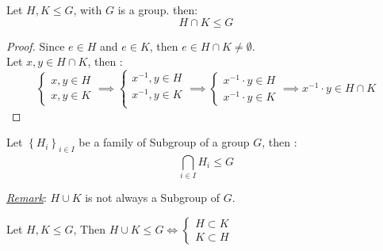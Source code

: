 \begin{proposition}
  Let $H, K \leq G $, with $G $ is a group. then: 
  \[
  H \cap K \leq G
  \]
\end{proposition}
  \begin{proof}
    Since $e \in H $ and $e \in  K$, then $e \in  H \cap K \neq  \emptyset $. \\
    Let $x,y \in  H \cap K $, then : 
    \[
    \begin{cases}
    x,y \in  H \\
    x,y \in  K
    \end{cases} \implies 
    \begin{cases}
    x^{-1}, y \in  H \\
    x^{-1}, y \in  K \\
    \end{cases}
    \implies  
    \begin{cases}
    x^{-1} \cdot y \in H \\
    x^{-1} \cdot y \in K
    \end{cases}
    \implies x^{-1} \cdot y \in H \cap K
    \]
  \end{proof}
 \begin{proposition}
   Let $\left\{ H_{i} \right\}_{i \in  I} $ be a family of Subgroup of a group $G $, then : 
   \[
     \bigcap_{i \in  I}^{} H_{i} \leq G
   \]
 \end{proposition}
\underline{\emph{Remark}}: $H \cup K $ is not always a Subgroup of $G $.
 \begin{proposition}
   Let $H, K \leq G$, Then $H \cup K \leq G \iff  \begin{cases}
   H \subset K \\
   K \subset H
   \end{cases}$  
 \end{proposition}
 
 

